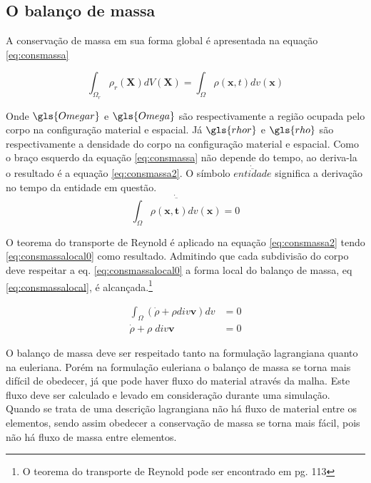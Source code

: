 \subsection{O balanço de massa}

A conservação de massa em sua forma global é apresentada na equação \ref{eq:consmassa}

\begin{equation}
    \int_{\Omega_r} \rho_r(\boldsymbol{X}) dV(\boldsymbol{X}) = \int_{\Omega} \rho(\boldsymbol{x},t) dv(\boldsymbol{x}) 
    \label{eq:consmassa}
\end{equation}

Onde $ \gls{Omegar} $ e $ \gls{Omega} $ são respectivamente a região ocupada pelo corpo na configuração material e espacial. Já $ \gls{rhor} $ e $ \gls{rho} $ são respectivamente a densidade do corpo na configuração material e espacial. Como o braço esquerdo da equação \ref{eq:consmassa} não depende do tempo, ao deriva-la o resultado é a equação \ref{eq:consmassa2}. O símbolo $ \dot{\overline{entidade}} $ significa a derivação no tempo da entidade em questão.
\begin{equation}
    \dot{\overline{\int_{\Omega} \rho(\boldsymbol{x,t}) dv(\boldsymbol{x})}} = 0
    \label{eq:consmassa2}
\end{equation}

O teorema do transporte de Reynold é aplicado na equação \ref{eq:consmassa2} tendo \ref{eq:consmassalocal0} como resultado. Admitindo que cada subdivisão do corpo deve respeitar a eq. \ref{eq:consmassalocal0} a forma local do balanço de massa, eq \ref{eq:consmassalocal}, é alcançada.\footnote{O teorema do transporte de Reynold pode ser encontrado em \cite{gurtin_fried_anand_2013} pg. 113}

\begin{align}
    \int_{\Omega} (\dot{\rho} + \rho div\boldsymbol{v})  dv &= 0 \label{eq:consmassalocal0} \\
    \dot{\rho} + \rho \; div\boldsymbol{v} &= 0 \label{eq:consmassalocal}
\end{align}

O balanço de massa deve ser respeitado tanto na formulação lagrangiana quanto na euleriana. Porém na formulação euleriana o balanço de massa se torna mais difícil de obedecer, já que pode haver fluxo do material através da malha. Este fluxo deve ser calculado e levado em consideração durante uma simulação. Quando se trata de uma descrição lagrangiana não há fluxo de material entre os elementos, sendo assim obedecer a conservação de massa se torna mais fácil, pois não há fluxo de massa entre elementos. 

